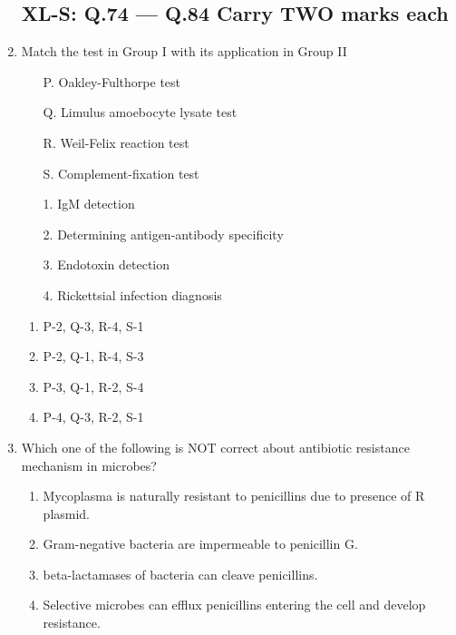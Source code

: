 \documentclass[journal,12pt,onecolumn]{IEEEtran}
\begin{document}
\begin{enumerate}
\subsection*{XL-S: Q.74 --- Q.84 Carry TWO marks each}

    \item \begin{minipage}{0.45\textwidth}
    Match the test in Group I with its application in Group II
    \begin{itemize}
        \item[P.] Oakley-Fulthorpe test
        \item[Q.] Limulus amoebocyte lysate test
        \item[R.] Weil-Felix reaction test
        \item[S.] Complement-fixation test
    \end{itemize}
    \end{minipage}
    \begin{minipage}{0.45\textwidth}
    \begin{itemize}
        \item[1.] IgM detection
        \item[2.] Determining antigen-antibody specificity
        \item[3.] Endotoxin detection
        \item[4.] Rickettsial infection diagnosis
    \end{itemize}
    \end{minipage}
    \begin{enumerate}
        \item P-2, Q-3, R-4, S-1
        \item P-2, Q-1, R-4, S-3
        \item P-3, Q-1, R-2, S-4
        \item P-4, Q-3, R-2, S-1
    \end{enumerate}

    \item Which one of the following is NOT correct about antibiotic resistance mechanism in microbes?
    \begin{enumerate}
        \item Mycoplasma is naturally resistant to penicillins due to presence of R plasmid.
        \item Gram-negative bacteria are impermeable to penicillin G.
        \item beta-lactamases of bacteria can cleave penicillins.
        \item Selective microbes can efflux penicillins entering the cell and develop resistance.
    \end{enumerate}


\end{enumerate}
\end{document}
